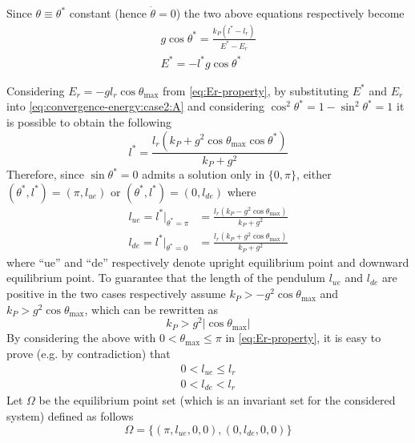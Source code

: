 \documentclass[main.tex]{subfiles}
\begin{document}
Since $\theta \equiv \theta^*$ constant (hence $\dot{\theta}
= 0$) the two above equations respectively become
\begin{gather}
  \label{eq:convergence-energy:case2:A}
  g\cos\theta^* = \frac{k_P(l^*-l_r)}{E^*-E_r} \\
  E^* = -l^*g\cos\theta^*
\end{gather}

Considering $E_r = -g l_r \cos\theta_{\max}$ from
\eqref{eq:Er-property}, by substituting $E^*$ and $E_r$ into
\eqref{eq:convergence-energy:case2:A} and considering 
$\cos^2\theta^* = 1 - \sin^2\theta^* = 1$ it is possible to
obtain the following
\begin{equation}
  l^* = \frac{l_r(k_P+g^2\cos\theta_{\max}\cos\theta^*)}{k_P+g^2}
\end{equation}
Therefore, since $\sin\theta^*=0$ admits a solution only in
$\{0, \pi\}$, either $(\theta^*, l^*)=(\pi, l_{ue})$ or $(\theta^*,
l^*)=(0, l_{de})$ where
\begin{align}
  l_{ue} = l^*\rvert_{\theta^*=\pi} &=
  \frac{l_r(k_P-g^2\cos\theta_{\max})}{k_P+g^2} \\
  l_{de} = l^*\rvert_{\theta^*=0} &=
  \frac{l_r(k_P+g^2\cos\theta_{\max})}{k_P+g^2}
\end{align}
where ``ue'' and ``de'' respectively denote upright equilibrium
point and downward equilibrium point. To guarantee that the length
of the pendulum $l_{ue}$ and $l_{de}$ are positive in the two
cases respectively assume $k_P>-g^2\cos\theta_{\max}$ and
$k_P>g^2\cos\theta_{\max}$, which can be rewritten as
\begin{equation}
  \label{eq:kP-property}
  k_P > g^2 |\cos\theta_{\max}|
\end{equation}
By considering the above with $0 < \theta_{\max} \le \pi$
in \eqref{eq:Er-property}, it is easy to prove (e.g. by
contradiction) that
\begin{gather}
  0 < l_{ue} \le l_r \\ 0 < l_{de} < l_r
\end{gather}
Let $\Omega$ be the equilibrium point set (which is an
invariant set for the considered system) defined as follows
\begin{equation}
  \label{eq:def-Omega}
  \Omega = \{ (\pi, l_{ue}, 0, 0), (0, l_{de}, 0, 0) \}
\end{equation}
\end{document}
